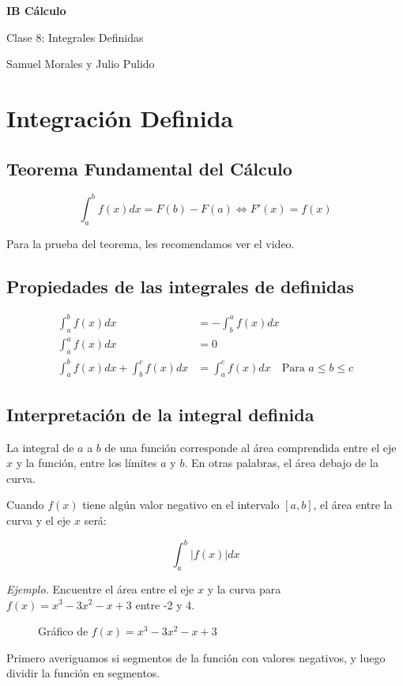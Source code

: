\documentclass[spanish,12pt]{article}
\begin{document}
	\begin{titlepage}
	\begin{center}
	\hspace{0pt}
	\vfill
	{\Large\textbf{{IB Cálculo}}}
	
	\medskip
	Clase 8: Integrales Definidas
	
	\medskip
    Samuel Morales y Julio Pulido
	
	\thispagestyle{empty}
	\vfill
	\end{center}
	\end{titlepage}
\newpage
\tableofcontents
\newpage
\section{Integración Definida}
\subsection{Teorema Fundamental del Cálculo}

$$\int^b_af(x)dx=F(b)-F(a)\iff F'(x)=f(x)$$

Para la prueba del teorema, les recomendamos ver el video.

\subsection{Propiedades de las integrales de definidas}

\begin{align*}
    \int^b_af(x)dx&=-\int^a_bf(x)dx\\
    \int^a_af(x)dx&=0\\
    \int^b_af(x)dx+\int^c_bf(x)dx&=\int^c_af(x)dx \quad \text{Para }a\leq b \leq c
\end{align*}

\subsection{Interpretación de la integral definida}

La integral de $a$ a $b$ de una función corresponde al área comprendida entre el eje $x$ y la función, entre los límites $a$ y $b$. En otras palabras, el área debajo de la curva. 

Cuando $f(x)$ tiene algún valor negativo en el intervalo $[a,b]$, el área entre la curva y el eje $x$ será:

$$\int^b_a|f(x)|dx$$

\textit{Ejemplo.}
Encuentre el área entre el eje $x$ y la curva para $f(x)=x^3-3x^2-x+3$ entre -2 y 4.
\begin{figure}[h!]
		\begin{center}
	\caption{Gráfico de $f(x)=x^3-3x^2-x+3$}
	\end{center}
	\end{figure}
Primero averiguamos si segmentos de la función con valores negativos, y luego dividir la función en segmentos. 
\end{document}
